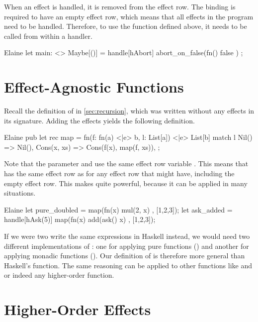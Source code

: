 When an effect is handled, it is removed from the effect row. The  binding is required to have an empty effect row, which means that all effects in the program need to be handled. Therefore, to use the  function defined above, it needs to be called from within a handler.

\begin{lst}{Elaine}
let main: <> Maybe[()] = handle[hAbort] {
    abort_on_false(fn() { false })
};
\end{lst}

\section{Effect-Agnostic Functions}

Recall the definition of  in \cref{sec:recursion}, which was written without any effects in its signature. Adding the effects yields the following definition.

\begin{lst}{Elaine}
pub let rec map = fn(f: fn(a) <|e> b, l: List[a]) <|e> List[b] {
    match l {
        Nil() => Nil(),
        Cons(x, xs) => Cons(f(x), map(f, xs)),
    }
};
\end{lst}

Note that the parameter  and  use the same effect row variable . This means that  has the same effect row as  for any effect row that  might have, including the empty effect row. This makes  quite powerful, because it can be applied in many situations.

\begin{lst}{Elaine}
let pure_doubled = map(fn(x) { mul(2, x) }, [1,2,3]);
let ask_added = handle[hAsk(5)] map(fn(x) { add(ask() x) }, [1,2,3]);
\end{lst}

If we were two write the same expressions in Haskell instead, we would need two different implementations of : one for applying pure functions () and another for applying monadic functions (). Our definition of  is therefore more general than Haskell's  function. The same reasoning can be applied to other functions like  and  or indeed any higher-order function.

\section{Higher-Order Effects}\label{sec:hoeffects}

